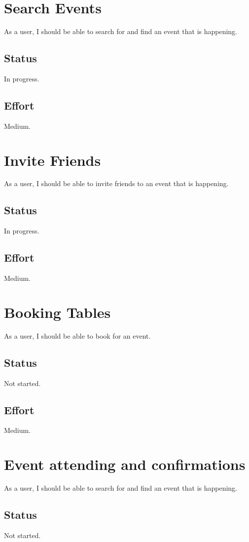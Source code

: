 \documentclass[10pt,a4paper]{article}
\begin{document}
\section{Search Events}
As a user, I should be able to search for and find an event that is happening.
\subsection{Status}
In progress.

\subsection{Effort}
Medium.

\section{Invite Friends}
As a user, I should be able to invite friends to an event that is happening.
\subsection{Status}
In progress.

\subsection{Effort}
Medium.

\section{Booking Tables}
As a user, I should be able to book for an event.
\subsection{Status}
Not started.

\subsection{Effort}
Medium.

\section{Event attending and confirmations}
As a user, I should be able to search for and find an event that is happening.
\subsection{Status}
Not started.
\end{document}
